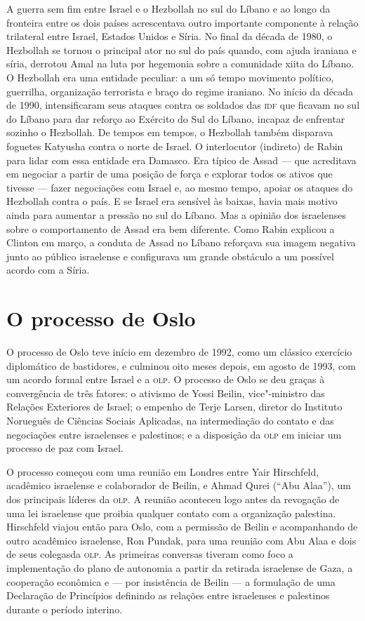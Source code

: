 A guerra sem fim entre Israel e o Hezbollah no sul do Líbano e ao longo
da fronteira entre os dois países acrescentava outro importante
componente à relação trilateral entre Israel, Estados Unidos e Síria. No
final da década de 1980, o Hezbollah se tornou o principal ator no sul
do país quando, com ajuda iraniana e síria, derrotou Amal na luta por
hegemonia sobre a comunidade xiita do Líbano. O Hezbollah era uma
entidade peculiar: a um só tempo movimento político, guerrilha,
organização terrorista e braço do regime iraniano. No início da década
de 1990, intensificaram seus ataques contra os soldados das \textsc{idf} que
ficavam no sul do Líbano para dar reforço ao Exército do Sul do Líbano,
incapaz de enfrentar sozinho o Hezbollah. De tempos em tempos, o
Hezbollah também disparava foguetes Katyusha contra o norte de Israel. O
interlocutor (indireto) de Rabin para lidar com essa entidade era Damasco.
Era típico de Assad --- que acreditava em negociar a partir de uma posição
de força e explorar todos os ativos que tivesse --- fazer negociações com
Israel e, ao mesmo tempo, apoiar os ataques do Hezbollah contra o país. E
se Israel era sensível às baixas, havia mais motivo ainda para aumentar
a pressão no sul do Líbano. Mas a opinião dos israelenses sobre o
comportamento de Assad era bem diferente. Como Rabin explicou a Clinton
em março, a conduta de Assad no Líbano reforçava sua imagem negativa
junto ao público israelense e configurava um grande obstáculo a um
possível acordo com a Síria.

\section{O processo de Oslo}

O processo de Oslo teve início em dezembro de 1992, como um clássico
exercício diplomático de bastidores, e culminou oito meses depois, em
agosto de 1993, com um acordo formal entre Israel e a \textsc{olp}. O processo de
Oslo se deu graças à convergência de três fatores: o ativismo de Yossi
Beilin, vice"-ministro das Relações Exteriores de Israel; o empenho de
Terje Larsen, diretor do Instituto Norueguês de Ciências Sociais
Aplicadas, na intermediação do contato e das negociações entre
israelenses e palestinos; e a disposição da \textsc{olp} em iniciar um processo
de paz com Israel.

O processo começou com uma reunião em Londres entre Yair Hirschfeld,
acadêmico israelense e colaborador de Beilin, e Ahmad Qurei (``Abu
Alaa''), um dos principais líderes da \textsc{olp}. A reunião aconteceu logo antes
da revogação de uma lei israelense que proibia qualquer contato com a
organização palestina. Hirschfeld viajou então para Oslo, com a
permissão de Beilin e acompanhando de outro acadêmico israelense, Ron
Pundak, para uma reunião com Abu Alaa e dois de seus colegasda \textsc{olp}. As
primeiras conversas tiveram como foco a implementação do plano de
autonomia a partir da retirada israelense de Gaza, a cooperação
econômica e --- por insistência de Beilin --- a formulação de uma
Declaração de Princípios definindo as relações entre israelenses e
palestinos durante o período interino.

